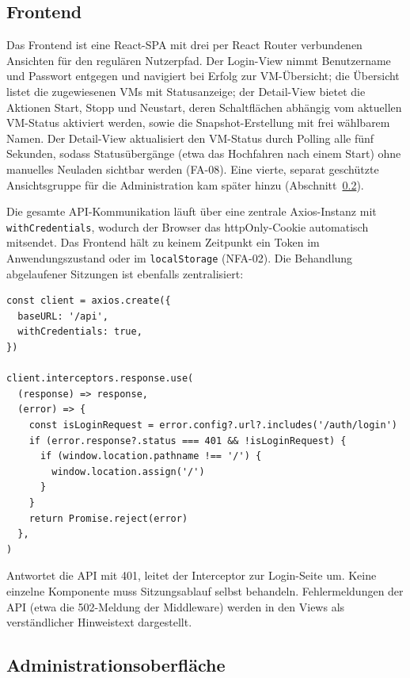 \documentclass[12pt,a4paper]{article}
\begin{document}
\subsection{Frontend}
\label{sec:impl-frontend}

Das Frontend ist eine React-SPA mit drei per React Router verbundenen Ansichten für den regulären Nutzerpfad. Der Login-View nimmt Benutzername und Passwort entgegen und navigiert bei Erfolg zur VM-Übersicht; die Übersicht listet die zugewiesenen VMs mit Statusanzeige; der Detail-View bietet die Aktionen Start, Stopp und Neustart, deren Schaltflächen abhängig vom aktuellen VM-Status aktiviert werden, sowie die Snapshot-Erstellung mit frei wählbarem Namen. Der Detail-View aktualisiert den VM-Status durch Polling alle fünf Sekunden, sodass Statusübergänge (etwa das Hochfahren nach einem Start) ohne manuelles Neuladen sichtbar werden (FA-08). Eine vierte, separat geschützte Ansichtsgruppe für die Administration kam später hinzu (Abschnitt~\ref{sec:impl-admin-ui}).

Die gesamte API-Kommunikation läuft über eine zentrale Axios-Instanz mit \texttt{withCredentials}, wodurch der Browser das httpOnly-Cookie automatisch mitsendet. Das Frontend hält zu keinem Zeitpunkt ein Token im Anwendungszustand oder im \texttt{localStorage} (NFA-02). Die Behandlung abgelaufener Sitzungen ist ebenfalls zentralisiert:

\begin{lstlisting}[caption={Zentrale Axios-Instanz mit 401-Interceptor (\texttt{src/api/client.js})}, label={lst:client}]
const client = axios.create({
  baseURL: '/api',
  withCredentials: true,
})

client.interceptors.response.use(
  (response) => response,
  (error) => {
    const isLoginRequest = error.config?.url?.includes('/auth/login')
    if (error.response?.status === 401 && !isLoginRequest) {
      if (window.location.pathname !== '/') {
        window.location.assign('/')
      }
    }
    return Promise.reject(error)
  },
)
\end{lstlisting}

Antwortet die API mit 401, leitet der Interceptor zur Login-Seite um. Keine einzelne Komponente muss Sitzungsablauf selbst behandeln. Fehlermeldungen der API (etwa die 502-Meldung der Middleware) werden in den Views als verständlicher Hinweistext dargestellt.

\subsection{Administrationsoberfläche}
\label{sec:impl-admin-ui}
\end{document}
